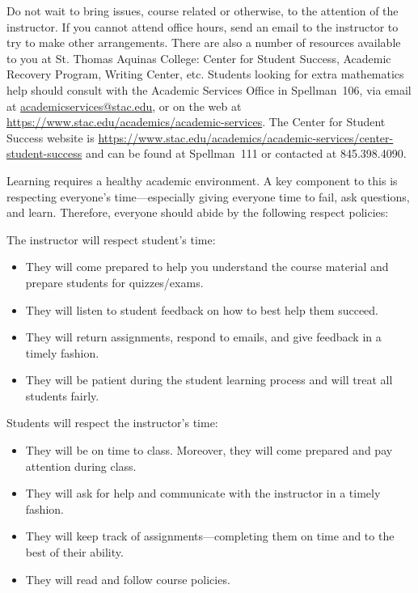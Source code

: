 \documentclass[11pt,letterpaper]{article}
\begin{document}
Do not wait to bring issues, course related or otherwise, to the attention of the instructor. If you cannot attend office hours, send an email to the instructor to try to make other arrangements. There are also a number of resources available to you at St. Thomas Aquinas College: Center for Student Success, Academic Recovery Program, Writing Center, etc. Students looking for extra mathematics help should consult with the Academic Services Office in Spellman~106, via email at \href{mailto:AcademicServices@stac.edu}{academicservices@stac.edu}, or on the web at \href{https://www.stac.edu/academics/academic-services}{https://www.stac.edu/academics/academic-services}. The Center for Student Success website is \url{https://www.stac.edu/academics/academic-services/center-student-success} and can be found at Spellman~111 or contacted at 845.398.4090.
\sectionbreak



Learning requires a healthy academic environment. A key component to this is respecting everyone's time---especially giving everyone time to fail, ask questions, and learn. Therefore, everyone should abide by the following respect policies: \pspace

The instructor will respect student's time:
	\begin{itemize}
	\item They will come prepared to help you understand the course material and prepare students for quizzes/exams. 
	\item They will listen to student feedback on how to best help them succeed. 
	\item They will return assignments, respond to emails, and give feedback in a timely fashion. 
	\item They will be patient during the student learning process and will treat all students fairly. 
	\end{itemize} \pspace

Students will respect the instructor's time:
	\begin{itemize}
	\item They will be on time to class. Moreover, they will come prepared and pay attention during class. 
	\item They will ask for help and communicate with the instructor in a timely fashion. 
	\item They will keep track of assignments---completing them on time and to the best of their ability.  
	\item They will read and follow course policies. 
	\end{itemize} \pspace
\end{document}
